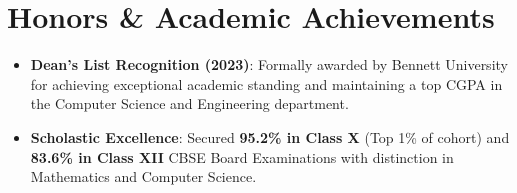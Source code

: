 \documentclass[letterpaper,10pt]{article}
\newcommand{\resumeItem}[1]{
  \item\small{
    {#1 \vspace{-1.5pt}}
  }
}
\newcommand{\resumeSubHeadingListStart}{\begin{itemize}[leftmargin=0.15in, label={}, itemsep=-1pt, topsep=1pt]}
\newcommand{\resumeSubHeadingListEnd}{\end{itemize}\vspace{-2pt}}
\begin{document}
\section{Honors \& Academic Achievements}
  \resumeSubHeadingListStart
    \resumeItem{\textbf{Dean's List Recognition (2023)}: Formally awarded by Bennett University for achieving exceptional academic standing and maintaining a top CGPA in the Computer Science and Engineering department.}
    \resumeItem{\textbf{Scholastic Excellence}: Secured \textbf{95.2\% in Class X} (Top 1\% of cohort) and \textbf{83.6\% in Class XII} CBSE Board Examinations with distinction in Mathematics and Computer Science.}
  \resumeSubHeadingListEnd
\end{document}
